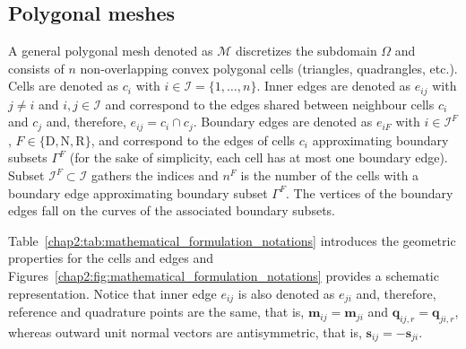 \subsection{Polygonal meshes}
\label{chap2:subsec:mathematical_formulation_polygonal_meshes}

A general polygonal mesh denoted as $\mathcal{M}$ discretizes the subdomain $\Omega$ and consists of $n$ non-overlapping convex polygonal cells (triangles, quadrangles, etc.).
Cells are denoted as $c_{i}$ with $i\in\mathcal{I}=\lbrace 1,\ldots,n\rbrace$.
Inner edges are denoted as $e_{ij}$ with $j\neq i$ and $i,j\in\mathcal{I}$ and correspond to the edges shared between neighbour cells $c_{i}$ and $c_{j}$ and, therefore, $e_{ij}=c_{i}\cap c_{j}$.
Boundary edges are denoted as $e_{iF}$ with $i\in\mathcal{I}^{F}$, $F\in\lbrace\textrm{D},\textrm{N},\textrm{R}\rbrace$, and correspond to the edges of cells $c_{i}$ approximating boundary subsets $\Gamma^{F}$ (for the sake of simplicity, each cell has at most one boundary edge).
Subset $\mathcal{I}^{F}\subset\mathcal{I}$ gathers the indices and $n^{F}$ is the number of the cells with a boundary edge approximating boundary subset $\Gamma^{F}$.
The vertices of the boundary edges fall on the curves of the associated boundary subsets.

Table~\ref{chap2:tab:mathematical_formulation_notations} introduces the geometric properties for the cells and edges and Figures~\ref{chap2:fig:mathematical_formulation_notations} provides a schematic representation.
Notice that inner edge $e_{ij}$ is also denoted as $e_{ji}$ and, therefore, reference and quadrature points are the same, that is, $\bm{m}_{ij}=\bm{m}_{ji}$ and $\bm{q}_{ij,r}=\bm{q}_{ji,r}$, whereas outward unit normal vectors are antisymmetric, that is, $\bm{s}_{ij}=-\bm{s}_{ji}$.

